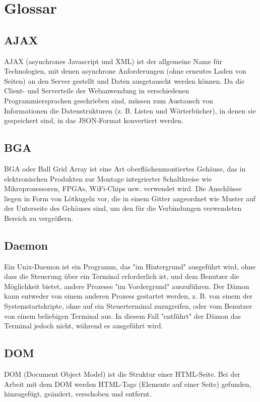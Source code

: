 \chapter*{Glossar}
%
\section*{AJAX}
\label{sec:appendix:ajax}
AJAX (asynchrones Javascript und XML) ist der allgemeine Name für Technologien, mit denen asynchrone Anforderungen (ohne erneutes Laden von Seiten) an den Server gestellt und Daten ausgetauscht werden können. Da die Client- und Serverteile der Webanwendung in verschiedenen Programmiersprachen geschrieben sind, müssen zum Austausch von Informationen die Datenstrukturen (z. B. Listen und Wörterbücher), in denen sie gespeichert sind, in das JSON-Format konvertiert werden.

\section*{BGA}
\label{sec:appendix:bga}
BGA oder Ball Grid Array ist eine Art oberflächenmontiertes Gehäuse, das in elektronischen Produkten zur Montage integrierter Schaltkreise wie Mikroprozessoren, FPGAs, WiFi-Chips usw. verwendet wird. Die Anschlüsse liegen in Form von Lötkugeln vor, die in einem Gitter angeordnet wie Muster auf der Unterseite des Gehäuses sind, um den für die Verbindungen verwendeten Bereich zu vergrößern.

\section*{Daemon}
\label{sec:appendix:daemon}
Ein Unix-Daemon ist ein Programm, das "im Hintergrund" ausgeführt wird, ohne dass die Steuerung über ein Terminal erforderlich ist, und dem Benutzer die Möglichkeit bietet, andere Prozesse "im Vordergrund" auszuführen. Der Dämon kann entweder von einem anderen Prozess gestartet werden, z. B. von einem der Systemstartskripte, ohne auf ein Steuerterminal zuzugreifen, oder vom Benutzer von einem beliebigen Terminal aus. In diesem Fall "entführt" der Dämon das Terminal jedoch nicht, während es ausgeführt wird.

\section*{DOM}
\label{sec:appendix:dom}
DOM (Document Object Model) ist die Struktur einer HTML-Seite. Bei der Arbeit mit dem DOM werden HTML-Tags (Elemente auf einer Seite) gefunden, hinzugefügt, geändert, verschoben und entfernt.

